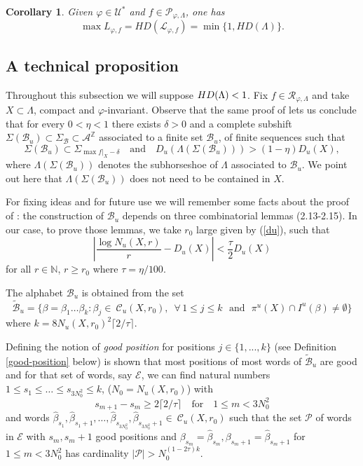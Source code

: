 \documentclass[12pt]{amsart}
\providecommand{\abs}[1]{\lvert#1\rvert}
\theoremstyle{plain} %
\newtheorem{corollary}[theorem]{Corollary}
\theoremstyle{definition} %
\numberwithin{equation}{section}
\begin{document}
\begin{corollary}\label{max}
Given $\varphi\in\mathcal{U}^*$ and $f\in \mathcal{P}_{\varphi,\Lambda}$, one has
    $$\max L_{\varphi, f}=HD(\mathcal{L}_{\varphi,f})=\min \{1,HD(\Lambda)\}.$$
\end{corollary}


\subsection{A technical proposition}\label{A technical proposition} Throughout this subsection we will suppose $HD(\Lambda)\\ <1$. Fix $f\in\mathcal{R}_{\varphi, \Lambda}$ and take $X \subset \Lambda$, compact and $\varphi$-invariant. Observe that the same proof of \cite[Proposition 2.9]{CMM16} lets us conclude that for every $0<\eta<1$ there exists $\delta>0$ and a complete subshift $\Sigma(\mathcal{B}_u)\subset \Sigma_{\mathcal{B}}\subset\mathcal{A}^{\mathbb{Z}}$ associated to a finite set $\mathcal{B}_u$, of finite sequences  such that  
$$\Sigma(\mathcal{B}_u)\subset\Sigma_{\max f|_X-\delta} \quad \textrm{and} \quad D_u(\Lambda(\Sigma(\mathcal{B}_u)))>(1-\eta)D_u(X),$$
where $\Lambda(\Sigma(\mathcal{B}_u))$ denotes the subhorseshoe of $\Lambda$ associated to $\mathcal{B}_u$. We point out here that $\Lambda(\Sigma(\mathcal{B}_u))$ does not need to be contained in $X$.

For fixing ideas and for future use we will remember some facts about the proof of \cite[Proposition 2.9]{CMM16}: the construction of $\mathcal{B}_u$ depends on three combinatorial lemmas (2.13-2.15). In our case, to prove those lemmas, we take $r_0$ large given by (\ref{du}), such that  
\begin{equation} \label{limit}
 \left|\frac{\log N_u(X,r)}{r}-D_u(X)\right|<\frac{\tau}{2}D_u(X)   
\end{equation}
for all $r\in\mathbb{N}$, $r\geq r_0$ where $\tau=\eta/100$.

The alphabet $\mathcal{B}_u$ is obtained from the set$$\widetilde{\mathcal{B}}_u=\{\beta=\beta_1\dots\beta_k : \beta_j\in\ \mathcal{C}_u(X,r_0), \,\,\, \forall \, 1\leq j\leq k \,\, \textrm{ and } \,\, \pi^u(X)\cap I^u(\beta)\neq\emptyset\}$$ 
where $k=8 N_u(X,r_0)^2\lceil2/\tau\rceil$. 

Defining the notion of \emph{good position} for positions $j \in \{1,...,k \}$ (see Definition \ref{good-position} below) is shown that
most positions of most words of $\widetilde{\mathcal{B}}_u$ are good and for that set of words, say $\mathcal{E}$, we can find natural numbers $1\leq s_1\leq \dots\leq s_{3N_0^2}\leq k$, ($N_0=N_u(X,r_0)$) with 
$$s_{m+1}-s_m\geq 2\lceil2/\tau\rceil \quad \mbox{for} \quad 1\leq m<3N_0^2$$ 
and words $\widehat{\beta}_{s_1}, \widehat{\beta}_{s_1+1}, \dots, \widehat{\beta}_{s_{3N_0^2}}, \widehat{\beta}_{s_{3N_0^2}+1}\in\ \mathcal{C}_u(X,r_0)$ such that the set $\mathcal{P}$ of words in $\mathcal{E}$ with $ s_m, s_{m}+1 $ good positions and $\beta_{s_m}=\widehat{\beta}_{s_m}, \beta_{s_m+1}=\widehat{\beta}_{s_m+1}$ for $ 1\leq m<3N_0^2$ has cardinality $\abs{\mathcal{P}}>N_0^{(1-2\tau)k}.$ 
\end{document}
